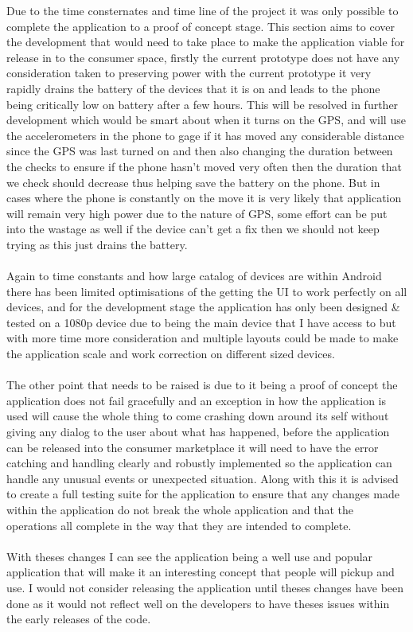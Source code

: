 Due to the time consternates and time line of the project it was only possible to complete the application to a proof of concept stage. This section aims to cover the development that would need to take place to make the application viable for release in to the consumer space, firstly the current prototype does not have any consideration taken to preserving power with the current prototype it very rapidly drains the battery of the devices that it is on and leads to the phone being critically low on battery after a few hours. This will be resolved in further development which would be smart about when it turns on the GPS, and will use the accelerometers in the phone to gage if it has moved any considerable distance since the GPS was last turned on and then also changing the duration between the checks to ensure if the phone hasn't moved very often then the duration that we check should decrease thus helping save the battery on the phone. But in cases where the phone is constantly on the move it is very likely that application will remain very high power due to the nature of GPS, some effort can be put into the wastage as well if the device can't get a fix then we should not keep trying as this just drains the battery.\\
\\
Again to time constants and how large catalog of devices are within Android there has been limited optimisations of the getting the UI to work perfectly on all devices, and for the development stage the application has only been designed \& tested on a 1080p device due to being the main device that I have access to but with more time more consideration and multiple layouts could be made to make the application scale and work correction on different sized devices.\\
\\
The other point that needs to be raised is due to it being a proof of concept the application does not fail gracefully and an exception in how the application is used will cause the whole thing to come crashing down around its self without giving any dialog to the user about what has happened, before the application can be released into the consumer marketplace it will need to have the error catching and handling clearly and robustly implemented so the application can handle any unusual events or unexpected situation. Along with this it is advised to create a full testing suite for the application to ensure that any changes made within the application do not break the whole application and that the operations all complete in the way that they are intended to complete.\\
\\
With theses changes I can see the application being a well use and popular application that will make it an interesting concept that people will pickup and use. I would not consider releasing the application until theses changes have been done as it would not reflect well on the developers to have theses issues within the early releases of the code.\\

